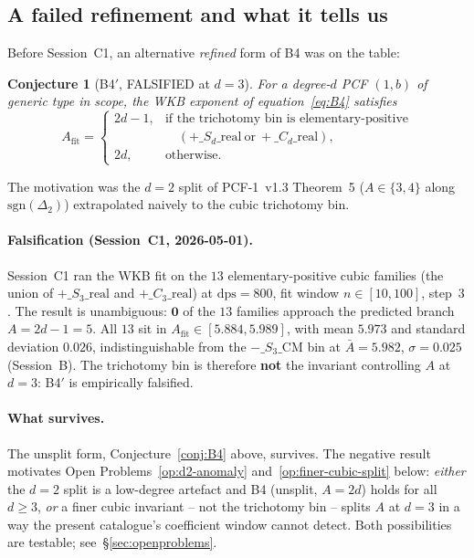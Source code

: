 \documentclass[11pt,a4paper]{article}
\newtheorem{conjecture}{Conjecture}
\theoremstyle{definition}
\theoremstyle{remark}
\begin{document}
\subsection{A failed refinement and what it tells us}\label{sec:B4-prime-falsified}

Before Session~C1, an alternative \emph{refined} form of B4 was on the
table:

\begin{conjecture}[B4$'$, FALSIFIED at $d=3$]\label{conj:B4prime}
For a degree-$d$ PCF $(1,b)$ of generic type in scope, the WKB exponent
of equation~\eqref{eq:B4} satisfies
\[
A_{\mathrm{fit}}=
\begin{cases}
2d-1, & \text{if the trichotomy bin is elementary-positive}\\
       & \quad (+\_S_d\_\mathrm{real}\ \text{or}\ +\_C_d\_\mathrm{real}),\\
2d, & \text{otherwise.}
\end{cases}
\]
\end{conjecture}

The motivation was the $d=2$ split of PCF-1~v1.3 Theorem~5
($A\in\{3,4\}$ along $\mathrm{sgn}(\Delta_2)$) extrapolated naively to
the cubic trichotomy bin.

\paragraph{Falsification (Session~C1, 2026-05-01).}
Session~C1 ran the WKB fit on the $13$ elementary-positive cubic
families (the union of $+\_S_3\_\mathrm{real}$ and
$+\_C_3\_\mathrm{real}$) at $\mathrm{dps}=800$, fit window
$n\in[10,100]$, step~$3$. The result is unambiguous: $\mathbf{0}$ of
the $13$ families approach the predicted branch $A=2d-1=5$. All $13$
sit in $A_{\mathrm{fit}}\in[5.884, 5.989]$, with mean $5.973$ and
standard deviation $0.026$, indistinguishable from the
$-\_S_3\_\mathrm{CM}$ bin at $\bar{A}=5.982$, $\sigma=0.025$
(Session~B). The trichotomy bin is therefore \textbf{not} the
invariant controlling $A$ at $d=3$: B4$'$ is empirically falsified.

\paragraph{What survives.}
The unsplit form, Conjecture~\ref{conj:B4} above, survives. The
negative result motivates Open Problems~\ref{op:d2-anomaly}
and~\ref{op:finer-cubic-split} below: \emph{either} the $d=2$ split is
a low-degree artefact and B4 (unsplit, $A=2d$) holds for all $d\ge 3$,
\emph{or} a finer cubic invariant -- not the trichotomy bin -- splits
$A$ at $d=3$ in a way the present catalogue's coefficient window
cannot detect. Both possibilities are testable; see~\S\ref{sec:openproblems}.
\end{document}
